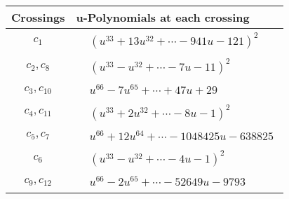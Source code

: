 \documentclass[1p]{elsarticle_modified}
\theoremstyle{definition}
\begin{document}
\begin{tabular}{m{50pt}|m{274pt}}
Crossings & \hspace{64pt}u-Polynomials at each crossing \\
\hline $$\begin{aligned}c_{1}\end{aligned}$$&$\begin{aligned}
&(u^{33}+13 u^{32}+\cdots-941 u-121)^{2}
\end{aligned}$\\
\hline $$\begin{aligned}c_{2},c_{8}\end{aligned}$$&$\begin{aligned}
&(u^{33}- u^{32}+\cdots-7 u-11)^{2}
\end{aligned}$\\
\hline $$\begin{aligned}c_{3},c_{10}\end{aligned}$$&$\begin{aligned}
&u^{66}-7 u^{65}+\cdots+47 u+29
\end{aligned}$\\
\hline $$\begin{aligned}c_{4},c_{11}\end{aligned}$$&$\begin{aligned}
&(u^{33}+2 u^{32}+\cdots-8 u-1)^{2}
\end{aligned}$\\
\hline $$\begin{aligned}c_{5},c_{7}\end{aligned}$$&$\begin{aligned}
&u^{66}+12 u^{64}+\cdots-1048425 u-638825
\end{aligned}$\\
\hline $$\begin{aligned}c_{6}\end{aligned}$$&$\begin{aligned}
&(u^{33}- u^{32}+\cdots-4 u-1)^{2}
\end{aligned}$\\
\hline $$\begin{aligned}c_{9},c_{12}\end{aligned}$$&$\begin{aligned}
&u^{66}-2 u^{65}+\cdots-52649 u-9793
\end{aligned}$\\
\hline
\end{tabular}\\~\\
\end{document}
